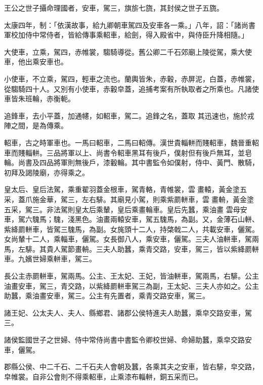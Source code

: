\begin{pinyinscope}
 王公之世子攝命理國者，安車，駕三，旗旂七旒，其封侯之世子五旒。



 太康四年，制：「依漢故事，給九卿朝車駕四及安車各一乘。」八年，詔：「諸尚書軍校加侍中常侍者，皆給傳事乘軺車，給劍，得入殿省中，與侍臣升降相隨。」



 大使車，立乘，駕四，赤帷裳，騶騎導從。舊公卿二千石郊廟上陵從駕，乘大使車，他出乘安車也。



 小使車，不立乘，駕四，輕車之流也。蘭輿皆朱，赤轂，赤屏泥，白蓋，赤帷裳，從騶騎四十人。又別有小使車，赤轂皁蓋，追捕考案有所執取者之所乘也。凡諸使車皆朱班輪，赤衡軛。



 追鋒車，去小平蓋，加通幰，如軺車，駕二。追鋒之名，蓋取
 其迅速也，施於戎陣之間，是為傳乘。



 軺車，古之時軍車也。一馬曰軺車，二馬曰軺傳。漢世貴輜軿而賤軺車，魏晉重軺車而賤輜軿。三品將軍以上、尚書令軺車黑耳有後戶，僕射但有後戶無耳，並皂輪。尚書及四品將軍則無後戶，漆轂輪。其中書監令如僕射，侍中、黃門、散騎，初拜及謁陵廟，亦得乘之。



 皇太后、皇后法駕，乘重翟羽蓋金根車，駕青輅，青帷裳，雲𣝛畫轅，黃金塗五采，蓋爪施金華，駕三，左右騑。其廟見小駕，則乘紫罽軿車，雲𣝛畫輈，黃金塗五采，駕三。非法駕則皇太后乘輦，皇后乘畫輪車。皇后先蠶，乘油畫
 雲母安車，駕六騩馬；騩，淺黑色。油畫兩轅安車，駕五騩馬，為副。又，金薄石山軿、紫絳罽軿車，皆駕三騩馬，為副。女旄頭十二人，持棨戟二人，共載安車，儷駕。女尚輦十二人，乘輜車，儷駕。女長御八人，乘安車，儷駕。三夫人油軿車，駕兩馬，左騑。其貴人駕節畫輈。三夫人助蠶，乘青交路，安車，駕三，皆以紫絳罽軿車。九嬪世婦乘軿車，駕三。



 長公主赤罽軿車，駕兩馬。公主、王太妃、王妃，皆油軿車，駕兩馬，右騑。公主油畫安車，駕三，青交路，以紫絳罽軿車駕三為副，王太妃、三夫人亦如之。公主助蠶，乘油畫安車，駕三。公主有先置者，乘青交路安車，駕三。



 諸王妃、公太夫人、夫人、縣鄉君、諸郡公侯特進夫人助蠶，乘皁交路安車，駕三。



 諸侯監國世子之世婦、侍中常侍尚書中書監令卿校世婦、命婦助蠶，乘皁交路安車，儷駕。



 郡縣公侯、中二千石、二千石夫人會朝及蠶，各乘其夫之安車，皆右騑，皁交路，皁帷裳。自非公會則不得乘軺車，止乘漆布輜軿，銅五采而已。




\end{pinyinscope}
